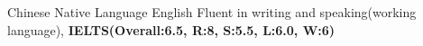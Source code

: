 \begin{cvhonors}
  \cvhonor
    {Chinese}
    {Native Language}
    {}
    {}
  \cvhonor
    {English}
    {Fluent in writing and speaking(working language), \textbf{IELTS(Overall:6.5, R:8, S:5.5, L:6.0, W:6)}}
    {}
    {}
\end{cvhonors}

